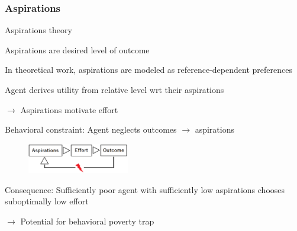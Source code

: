 \documentclass[hideothersubsections, usenames,dvipsnames,11pt]{beamer}
\newenvironment{itemize_2pt}{\itemize\addtolength{\itemsep}{2pt}}{\enditemize}
\begin{document}
\begin{frame}
\frametitle{Aspirations}

Aspirations theory \citep[following][]{Dalton2016}
\begin{itemize_2pt}
	\item Aspirations are \textcolor{bdf}{desired level of outcome}	
	
	\item In theoretical work, aspirations are modeled as \textcolor{bdf}{reference-dependent preferences}
	\begin{itemize_2pt}
		\item Agent derives utility from relative level wrt their aspirations
		\item[] $\rightarrow$ Aspirations motivate effort
		\item Behavioral constraint: \textcolor{bdf}{Agent neglects outcomes $\rightarrow$ aspirations}
	\end{itemize_2pt}
	
	\vspace{0.5em}
	
	\begin{figure}[htbp]
		\centering
		\includegraphics[width=12em]{pics/asp.png}
		\label{Aspirations}
	\end{figure}	
	
	\pause
	
	\item Consequence: Sufficiently \textcolor{bdf}{poor agent} with sufficiently \textcolor{bdf}{low aspirations} chooses \textcolor{bdf}{suboptimally low effort}
	\item[] $\rightarrow$ Potential for behavioral poverty trap
	\vspace{0.1in}
	
	
\end{itemize_2pt}
\end{frame}
\end{document}
